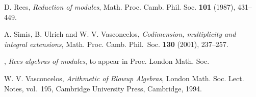 \documentclass{proc-l}
\theoremstyle{plain}
\theoremstyle{definition}
\begin{document}
\begin{thebibliography}{EHU1}
D. Rees, {\em Reduction of modules}, Math. Proc.
Camb. Phil. Soc. {\bf 101} (1987), 431--449. 


A. Simis, B. Ulrich and W. V. Vasconcelos, {\em Codimension, multiplicity and integral
extensions}, Math. Proc. Camb. Phil.~Soc. {\bf 130} (2001), 237--257.

\bysame, \emph{Rees algebras of modules}, to appear in Proc. London Math. Soc. 



 W. V. Vasconcelos, {\em Arithmetic of Blowup Algebras}, London
Math. Soc. Lect. Notes, vol.~195, Cambridge University Press, Cambridge, 1994.


\end{thebibliography}
\end{document}
